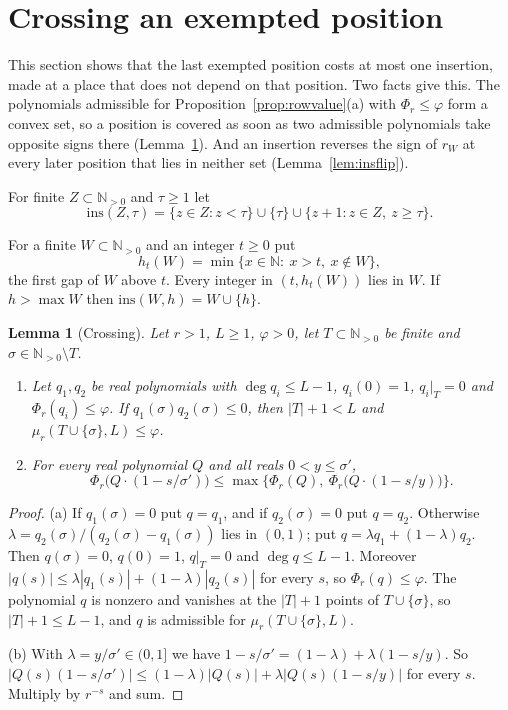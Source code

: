 \documentclass[11pt]{article}
\newtheorem{lemma}[theorem]{Lemma}
\newcommand{\N}{\mathbb N}
\begin{document}
\section{Crossing an exempted position}\label{sec:crossing}

This section shows that the last exempted position costs at most one
insertion, made at a place that does not depend on that position.  Two
facts give this.  The polynomials admissible for
Proposition~\ref{prop:rowvalue}(a) with $\Phi_r\le\varphi$ form a convex set,
so a position is covered as soon as two admissible polynomials take opposite
signs there (Lemma~\ref{lem:crossing}).  And an insertion reverses the sign
of $r_W$ at every later position that lies in neither set
(Lemma~\ref{lem:insflip}).

For finite $Z\subset\N_{>0}$ and $\tau\ge1$ let
\[
  \mathrm{ins}(Z,\tau)=\{z\in Z:z<\tau\}\cup\{\tau\}\cup\{z+1:z\in Z,\ z\ge\tau\}.
\]

For a finite $W\subset\N_{>0}$ and an integer $t\ge0$ put
\[
  h_t(W)=\min\{x\in\N:\ x>t,\ x\notin W\},
\]
the first gap of $W$ above $t$.  Every integer in $(t,h_t(W))$ lies in $W$.
If $h>\max W$ then $\mathrm{ins}(W,h)=W\cup\{h\}$.

\begin{lemma}[Crossing]\label{lem:crossing}
Let $r>1$, $L\ge1$, $\varphi>0$, let $T\subset\N_{>0}$ be finite and
$\sigma\in\N_{>0}\setminus T$.
\begin{enumerate}
\item[(a)] Let $q_1,q_2$ be real polynomials with $\deg q_i\le L-1$,
$q_i(0)=1$, $q_i|_T=0$ and $\Phi_r(q_i)\le\varphi$.  If
$q_1(\sigma)q_2(\sigma)\le0$, then $|T|+1<L$ and
$\mu_r(T\cup\{\sigma\},L)\le\varphi$.
\item[(b)] For every real polynomial $Q$ and all reals $0<y\le\sigma'$,
\[
  \Phi_r\bigl(Q\cdot(1-s/\sigma')\bigr)\le
  \max\bigl\{\Phi_r(Q),\ \Phi_r\bigl(Q\cdot(1-s/y)\bigr)\bigr\}.
\]
\end{enumerate}
\end{lemma}

\begin{proof}
(a) If $q_1(\sigma)=0$ put $q=q_1$, and if $q_2(\sigma)=0$ put $q=q_2$.
Otherwise $\lambda=q_2(\sigma)/(q_2(\sigma)-q_1(\sigma))$ lies in $(0,1)$;
put $q=\lambda q_1+(1-\lambda)q_2$.  Then $q(\sigma)=0$, $q(0)=1$, $q|_T=0$
and $\deg q\le L-1$.  Moreover
$|q(s)|\le\lambda|q_1(s)|+(1-\lambda)|q_2(s)|$ for every $s$, so
$\Phi_r(q)\le\varphi$.  The polynomial $q$ is nonzero and vanishes at the
$|T|+1$ points of $T\cup\{\sigma\}$, so $|T|+1\le L-1$, and $q$ is admissible
for $\mu_r(T\cup\{\sigma\},L)$.

(b) With $\lambda=y/\sigma'\in(0,1]$ we have
$1-s/\sigma'=(1-\lambda)+\lambda(1-s/y)$.  So
$|Q(s)(1-s/\sigma')|\le(1-\lambda)|Q(s)|+\lambda|Q(s)(1-s/y)|$ for every $s$.
Multiply by $r^{-s}$ and sum.
\end{proof}
\end{document}
